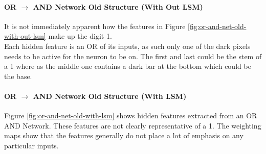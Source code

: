 \begin{minipage}[t]{0.45\textwidth}
	\vspace{0px}

	
	\paragraph{OR $\rightarrow$ AND Network Old Structure (With Out LSM)}
	It is not immediately apparent how the features in Figure \ref{fig:or-and-net-old-with-out-lsm} make up the digit 1. \\
	
	Each hidden feature is an OR of its inputs, as such only one of the dark pixels needs to be active for the neuron to be on. The first and last could be the stem of a 1 where as the middle one contains a dark bar at the bottom which could be the base.

	\paragraph{OR $\rightarrow$ AND Network Old Structure (With LSM)}
	Figure \ref{fig:or-and-net-old-with-lsm} shows hidden features extracted from an OR AND Network. These features are not clearly representative of a 1. The weighting maps show that the features generally do not place a lot of emphasis on any particular inputs.

\end{minipage}
\hspace{0.1\textwidth}
